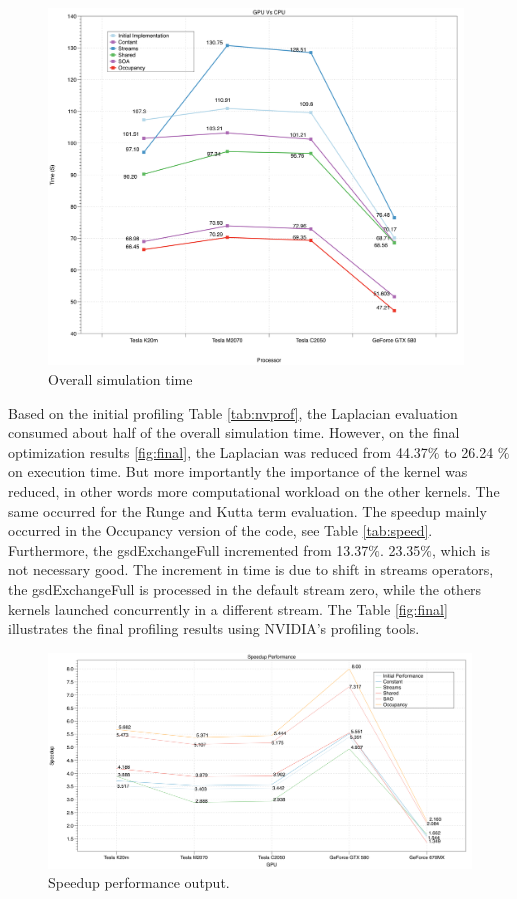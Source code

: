 \begin{figure}[htbp]
	\centering
		\includegraphics[width=0.98\textwidth]{Figures/gpuOptimization.png}
		\smallskip
	\caption[Overall simulation time]{Overall simulation time}
	\label{fig:gpuop}
\end{figure}


Based on the initial profiling Table \ref{tab:nvprof}, the Laplacian evaluation consumed about half of the overall simulation time. However, on the final optimization results \ref{fig:final}, the Laplacian was reduced from 44.37$\%$ to 26.24 $\%$ on execution time. But more importantly the importance of the kernel was reduced, in other words more computational workload on the other kernels. The same occurred for the Runge and Kutta term evaluation. The speedup mainly occurred in the Occupancy version of the code, see Table \ref{tab:speed}. Furthermore, the {\listf gsdExchangeFull} incremented from 13.37$\%$. 23.35$\%$, which is not necessary good. The increment in time is due to shift in streams operators, the {\listf gsdExchangeFull} is processed in the default stream zero, while the others kernels launched concurrently in a different stream. The Table \ref{fig:final} illustrates the final profiling results using NVIDIA's profiling tools.

\begin{figure}[htbp]
	\centering
		\includegraphics[width=1.0 \textwidth]{Figures/speedup.png}
		\smallskip
	\caption[Speedup performance output]{Speedup performance output.}
	\label{fig:speedup}
\end{figure}

